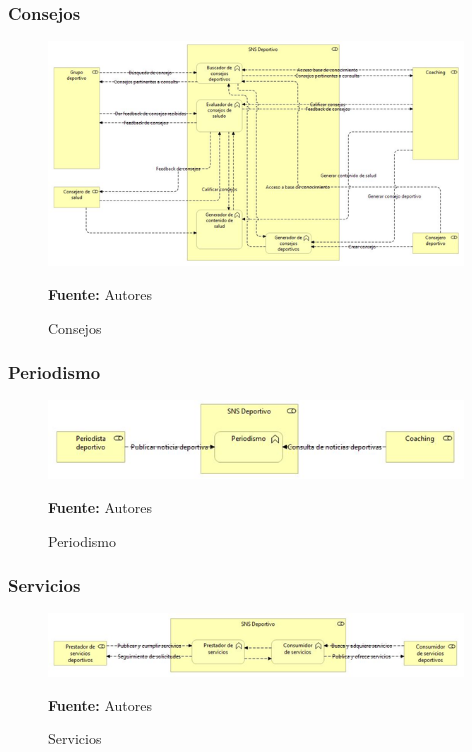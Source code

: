 \subsubsection{Consejos}

\begin{figure}[!htb]
  \begin{center}
    \includegraphics[width=11cm]{./imagenes/business_functions/Consejos.png}
    \caption{Consejos}
    \label{fig:BF_Consejos}
    \textbf{Fuente:}  Autores
  \end{center}
\end{figure}

\subsubsection{Periodismo}

\begin{figure}[!htb]
  \begin{center}
    \includegraphics[width=11cm]{./imagenes/business_functions/Periodismo.png}
    \caption{Periodismo}
    \label{fig:BF_Periodismo}
    \textbf{Fuente:}  Autores
  \end{center}
\end{figure}

\subsubsection{Servicios}

\begin{figure}[!htb]
  \begin{center}
    \includegraphics[width=11cm]{./imagenes/business_functions/Servicios.png}
    \caption{Servicios}
    \label{fig:BF_Servicios}
    \textbf{Fuente:}  Autores
  \end{center}
\end{figure}

